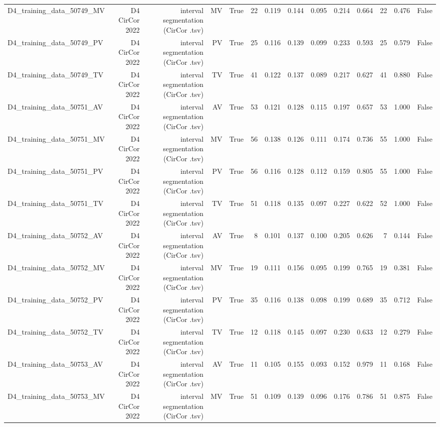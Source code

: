 \begin{table}[htbp]
\begin{tabular}{lrrrrrrrrrrrrr}
    D4\_training\_data\_50749\_MV & D4 CirCor 2022 & interval segmentation (CirCor .tsv) & MV & True & 22 & 0.119 & 0.144 & 0.095 & 0.214 & 0.664 & 22 & 0.476 & False \\
    D4\_training\_data\_50749\_PV & D4 CirCor 2022 & interval segmentation (CirCor .tsv) & PV & True & 25 & 0.116 & 0.139 & 0.099 & 0.233 & 0.593 & 25 & 0.579 & False \\
    D4\_training\_data\_50749\_TV & D4 CirCor 2022 & interval segmentation (CirCor .tsv) & TV & True & 41 & 0.122 & 0.137 & 0.089 & 0.217 & 0.627 & 41 & 0.880 & False \\
    D4\_training\_data\_50751\_AV & D4 CirCor 2022 & interval segmentation (CirCor .tsv) & AV & True & 53 & 0.121 & 0.128 & 0.115 & 0.197 & 0.657 & 53 & 1.000 & False \\
    D4\_training\_data\_50751\_MV & D4 CirCor 2022 & interval segmentation (CirCor .tsv) & MV & True & 56 & 0.138 & 0.126 & 0.111 & 0.174 & 0.736 & 55 & 1.000 & False \\
    D4\_training\_data\_50751\_PV & D4 CirCor 2022 & interval segmentation (CirCor .tsv) & PV & True & 56 & 0.116 & 0.128 & 0.112 & 0.159 & 0.805 & 55 & 1.000 & False \\
    D4\_training\_data\_50751\_TV & D4 CirCor 2022 & interval segmentation (CirCor .tsv) & TV & True & 51 & 0.118 & 0.135 & 0.097 & 0.227 & 0.622 & 52 & 1.000 & False \\
    D4\_training\_data\_50752\_AV & D4 CirCor 2022 & interval segmentation (CirCor .tsv) & AV & True & 8 & 0.101 & 0.137 & 0.100 & 0.205 & 0.626 & 7 & 0.144 & False \\
    D4\_training\_data\_50752\_MV & D4 CirCor 2022 & interval segmentation (CirCor .tsv) & MV & True & 19 & 0.111 & 0.156 & 0.095 & 0.199 & 0.765 & 19 & 0.381 & False \\
    D4\_training\_data\_50752\_PV & D4 CirCor 2022 & interval segmentation (CirCor .tsv) & PV & True & 35 & 0.116 & 0.138 & 0.098 & 0.199 & 0.689 & 35 & 0.712 & False \\
    D4\_training\_data\_50752\_TV & D4 CirCor 2022 & interval segmentation (CirCor .tsv) & TV & True & 12 & 0.118 & 0.145 & 0.097 & 0.230 & 0.633 & 12 & 0.279 & False \\
    D4\_training\_data\_50753\_AV & D4 CirCor 2022 & interval segmentation (CirCor .tsv) & AV & True & 11 & 0.105 & 0.155 & 0.093 & 0.152 & 0.979 & 11 & 0.168 & False \\
    D4\_training\_data\_50753\_MV & D4 CirCor 2022 & interval segmentation (CirCor .tsv) & MV & True & 51 & 0.109 & 0.139 & 0.096 & 0.176 & 0.786 & 51 & 0.875 & False \\

\end{tabular}
\end{table}
